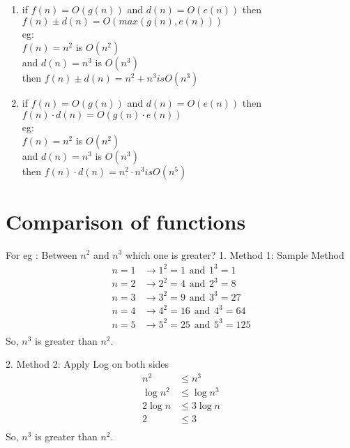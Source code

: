 \documentclass{article}
\begin{document}
\begin{enumerate}
\item if $f(n) = O(g(n))$ and $d(n) = O(e(n))$ then $f(n) \pm d(n) = O(max(g(n), e(n)))$\\
eg: \\
\quad $f(n) = n^2$ is $O(n^2)$ \\ \quad and $d(n) = n^3$ is $O(n^3)$ \\ \quad then $f(n) \pm d(n) = n^2 + n^3 is O(n^3)$\\

\item if $f(n) = O(g(n))$ and $d(n) = O(e(n))$ then $f(n) \cdot d(n) = O(g(n) \cdot e(n))$\\
eg: \\
\quad $f(n) = n^2$ is $O(n^2)$ \\ \quad and $d(n) = n^3$ is $O(n^3)$ \\ \quad then $f(n) \cdot d(n) = n^2 \cdot n^3 is O(n^5)$\\
\end{enumerate}

\section{Comparison of functions}

For eg : Between $n^2$ and $n^3$ which one is greater?
1. Method 1: Sample Method
\[
\begin{aligned}
    n = 1 &\rightarrow 1^2 = 1 \hspace{5pt} \text{and} \hspace{5pt} 1^3 = 1 \\
    n = 2 &\rightarrow 2^2 = 4 \hspace{5pt} \text{and} \hspace{5pt} 2^3 = 8 \\
    n = 3 &\rightarrow 3^2 = 9 \hspace{5pt} \text{and} \hspace{5pt} 3^3 = 27 \\
    n = 4 &\rightarrow 4^2 = 16 \hspace{5pt} \text{and} \hspace{5pt} 4^3 = 64 \\
    n = 5 &\rightarrow 5^2 = 25 \hspace{5pt} \text{and} \hspace{5pt} 5^3 = 125 \\
\end{aligned}
\]  
So, $n^3$ is greater than $n^2$.

2. Method 2: Apply Log on both sides
\[
\begin{aligned}
    n^2 &\leq n^3 \\
    \log{n^2} &\leq \log{n^3} \\
    2\log{n} &\leq 3\log{n} \\
    2 &\leq 3 \\
\end{aligned}
\]  
So, $n^3$ is greater than $n^2$.
\end{document}
